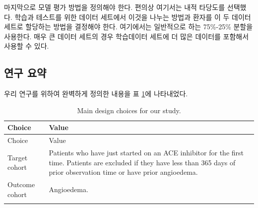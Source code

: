 \documentclass[10.5pt]{book}
\theoremstyle{definition}
\theoremstyle{definition}
\theoremstyle{definition}
\theoremstyle{remark}
\begin{document}
마지막으로 모델 평가 방법을 정의해야 한다. 편의상 여기서는 내적 타당도를
선택했다. 학습과 테스트를 위한 데이터 세트에서 이것을 나누는 방법과
환자를 이 두 데이터 세트로 할당하는 방법을 결정해야 한다. 여기에서는
일반적으로 하는 75\%-25\% 분할을 사용한다. 매우 큰 데이터 세트의 경우
학습데이터 세트에 더 많은 데이터를 포함해서 사용할 수 있다.

\subsection{연구 요약}\label{--1}

우리 연구를 위하여 완벽하게 정의한 내용을 표 \ref{tab:plpSummary}에
나타내었다.

\begin{longtable}[]{@{}ll@{}}
\caption{\label{tab:plpSummary} Main design choices for our
study.}\tabularnewline
\toprule
\begin{minipage}[b]{0.23\columnwidth}\raggedright\strut
Choice\strut
\end{minipage} & \begin{minipage}[b]{0.71\columnwidth}\raggedright\strut
Value\strut
\end{minipage}\tabularnewline
\midrule
\endfirsthead
\toprule
\begin{minipage}[b]{0.23\columnwidth}\raggedright\strut
Choice\strut
\end{minipage} & \begin{minipage}[b]{0.71\columnwidth}\raggedright\strut
Value\strut
\end{minipage}\tabularnewline
\midrule
\endhead
\begin{minipage}[t]{0.23\columnwidth}\raggedright\strut
Target cohort\strut
\end{minipage} & \begin{minipage}[t]{0.71\columnwidth}\raggedright\strut
Patients who have just started on an ACE inhibitor for the first time.
Patients are excluded if they have less than 365 days of prior
observation time or have prior angioedema.\strut
\end{minipage}\tabularnewline
\begin{minipage}[t]{0.23\columnwidth}\raggedright\strut
Outcome cohort\strut
\end{minipage} & \begin{minipage}[t]{0.71\columnwidth}\raggedright\strut
Angioedema.\strut
\end{minipage}\tabularnewline
\begin{minipage}[t]{0.23\columnwidth}\raggedright\strut

\end{minipage}
\end{longtable}
\end{document}
